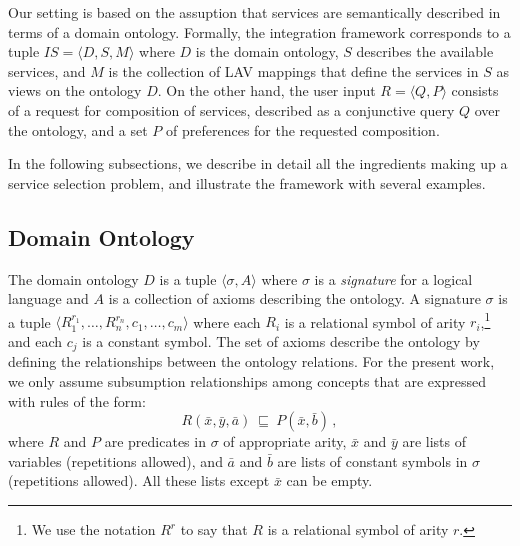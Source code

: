\documentclass{llncs}
\newcommand{\tup}[1]{\langle #1 \rangle}
\newcommand{\orule}{\sqsubseteq}
\begin{document}
Our setting is based on the assuption that services are
semantically described in terms of a domain ontology. 
Formally, the integration framework corresponds to a tuple
$IS=\tup{D,S,M}$ where $D$ is the domain ontology, $S$ describes
the available services, and $M$ is the collection of LAV mappings
that define the services in $S$ as views on the ontology $D$. 
On the other hand, the user input $R=\tup{Q,P}$ consists of a
request for composition of services, described as a conjunctive
query $Q$ over the ontology, and a set $P$ of preferences for
the requested composition.

In the following subsections, we describe in detail all the
ingredients making up a service selection problem, and illustrate
the framework with several examples.

\subsection{Domain Ontology}

The domain ontology $D$ is a tuple $\tup{\sigma,A}$ where $\sigma$ is a
\emph{signature} for a logical language and $A$ is a collection of axioms
describing the ontology.
A signature $\sigma$ is a tuple $\tup{R_1^{r_1},\ldots,R_n^{r_n},c_1,\ldots,c_m}$
where each $R_i$ is a relational symbol of arity $r_i$,\footnote{We use
the notation $R^r$ to say that $R$ is a relational symbol of arity $r$.}
and each $c_j$ is a constant symbol.
The set of axioms describe the ontology by defining the relationships
between the ontology relations. %
For the present work, we only assume subsumption relationships among
concepts that are expressed with rules of the form:
\begin{equation}
\label{eq:orule}
R(\bar x,\bar y, \bar a)\ \orule\ P(\bar x, \bar b)\,,
\end{equation}
where $R$ and $P$ are predicates in $\sigma$ of appropriate arity,
$\bar x$ and $\bar y$ are lists of variables (repetitions allowed),
and $\bar a$ and $\bar b$ are lists of constant symbols in $\sigma$
(repetitions allowed). All these lists except $\bar x$ can be empty.
\end{document}

